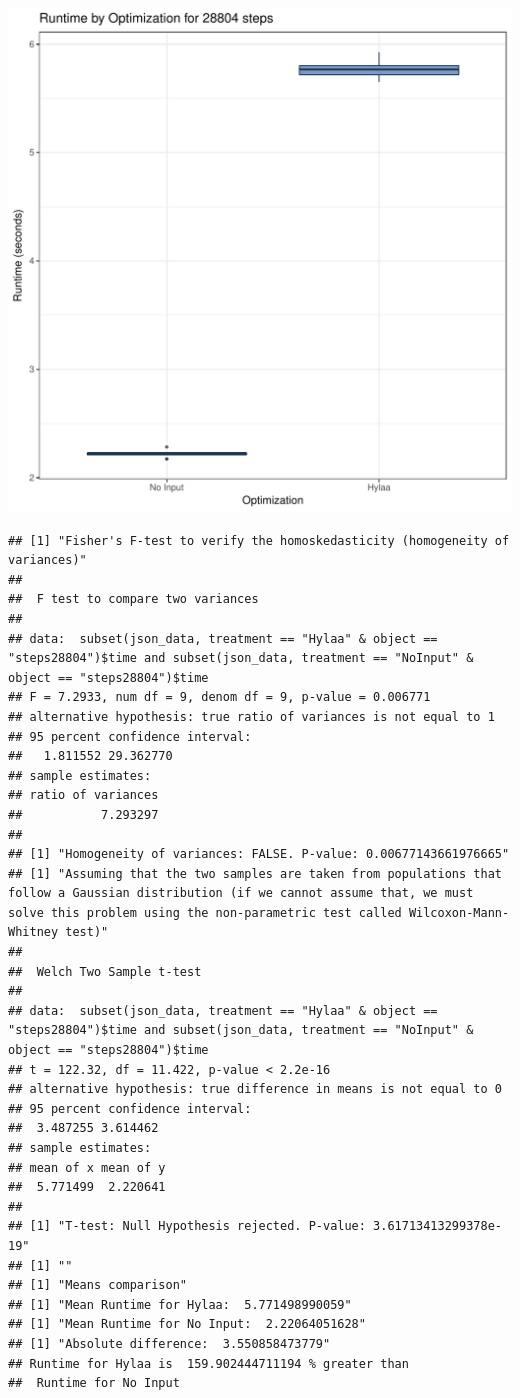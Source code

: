 \documentclass{article}\usepackage[]{graphicx}\usepackage[]{color}
\makeatletter
\def\maxwidth{ %
  \ifdim\Gin@nat@width>\linewidth
    \linewidth
  \else
    \Gin@nat@width
  \fi
}
\newenvironment{kframe}{%
 \def\at@end@of@kframe{}%
 \ifinner\ifhmode%
  \def\at@end@of@kframe{\end{minipage}}%
  \begin{minipage}{\columnwidth}%
 \fi\fi%
 \def\FrameCommand##1{\hskip\@totalleftmargin \hskip-\fboxsep
 \colorbox{shadecolor}{##1}\hskip-\fboxsep
     \hskip-\linewidth \hskip-\@totalleftmargin \hskip\columnwidth}%
 \MakeFramed {\advance\hsize-\width
   \@totalleftmargin\z@ \linewidth\hsize
   \@setminipage}}%
 {\par\unskip\endMakeFramed%
 \at@end@of@kframe}
\newenvironment{knitrout}{}{} %
\makeatother
\begin{document}
\begin{knitrout}
\color{fgcolor}
\includegraphics[width=\maxwidth]{figure/RH4_steps28804-1} 
\begin{kframe}\begin{verbatim}
## [1] "Fisher's F-test to verify the homoskedasticity (homogeneity of variances)"
## 
## 	F test to compare two variances
## 
## data:  subset(json_data, treatment == "Hylaa" & object == "steps28804")$time and subset(json_data, treatment == "NoInput" & object == "steps28804")$time
## F = 7.2933, num df = 9, denom df = 9, p-value = 0.006771
## alternative hypothesis: true ratio of variances is not equal to 1
## 95 percent confidence interval:
##   1.811552 29.362770
## sample estimates:
## ratio of variances 
##           7.293297 
## 
## [1] "Homogeneity of variances: FALSE. P-value: 0.00677143661976665"
## [1] "Assuming that the two samples are taken from populations that follow a Gaussian distribution (if we cannot assume that, we must solve this problem using the non-parametric test called Wilcoxon-Mann-Whitney test)"
## 
## 	Welch Two Sample t-test
## 
## data:  subset(json_data, treatment == "Hylaa" & object == "steps28804")$time and subset(json_data, treatment == "NoInput" & object == "steps28804")$time
## t = 122.32, df = 11.422, p-value < 2.2e-16
## alternative hypothesis: true difference in means is not equal to 0
## 95 percent confidence interval:
##  3.487255 3.614462
## sample estimates:
## mean of x mean of y 
##  5.771499  2.220641 
## 
## [1] "T-test: Null Hypothesis rejected. P-value: 3.61713413299378e-19"
## [1] ""
## [1] "Means comparison"
## [1] "Mean Runtime for Hylaa:  5.771498990059"
## [1] "Mean Runtime for No Input:  2.22064051628"
## [1] "Absolute difference:  3.550858473779"
## Runtime for Hylaa is  159.902444711194 % greater than 
##  Runtime for No Input
\end{verbatim}
\end{kframe}
\end{knitrout}
\end{document}
